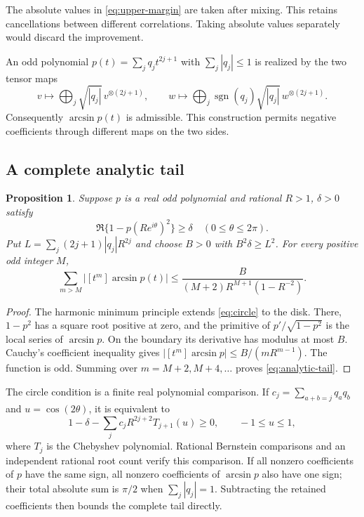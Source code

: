 \documentclass[11pt]{article}
\newtheorem{proposition}{Proposition}
\begin{document}
The absolute values in \eqref{eq:upper-margin} are taken after mixing. This retains cancellations between different correlations. Taking absolute values separately would discard the improvement.

An odd polynomial $p(t)=\sum_jq_jt^{2j+1}$ with $\sum_j|q_j|\le1$ is realized by the two tensor maps
\begin{equation*}
 v\longmapsto\bigoplus_j\sqrt{|q_j|}\,v^{\otimes(2j+1)},
 \qquad
 w\longmapsto\bigoplus_j\operatorname{sgn}(q_j)\sqrt{|q_j|}\,
 w^{\otimes(2j+1)}.
\end{equation*}
Consequently $\arcsin p(t)$ is admissible. This construction permits negative coefficients through different maps on the two sides.

\subsection{A complete analytic tail}
\begin{proposition}\label{prop:analytic-tail}
Suppose $p$ is a real odd polynomial and rational $R>1$, $\delta>0$ satisfy
\begin{equation}\label{eq:circle}
 \Re\{1-p(Re^{i\theta})^2\}\ge\delta
 \quad(0\le\theta\le2\pi).
\end{equation}
Put $L=\sum_j(2j+1)|q_j|R^{2j}$ and choose $B>0$ with $B^2\delta\ge L^2$. For every positive odd integer $M$,
\begin{equation}\label{eq:analytic-tail}
 \sum_{m>M}|[t^m]\arcsin p(t)|
 \le\frac{B}{(M+2)R^{M+1}(1-R^{-2})}.
\end{equation}
\end{proposition}
\begin{proof}
The harmonic minimum principle extends \eqref{eq:circle} to the disk. There, $1-p^2$ has a square root positive at zero, and the primitive of $p'/\sqrt{1-p^2}$ is the local series of $\arcsin p$. On the boundary its derivative has modulus at most $B$. Cauchy's coefficient inequality gives $|[t^m]\arcsin p|\le B/(mR^{m-1})$. The function is odd. Summing over $m=M+2,M+4,\ldots$ proves \eqref{eq:analytic-tail}.
\end{proof}

The circle condition is a finite real polynomial comparison. If $c_j=\sum_{a+b=j}q_aq_b$ and $u=\cos(2\theta)$, it is equivalent to
\begin{equation}\label{eq:circle-polynomial}
 1-\delta-\sum_jc_jR^{2j+2}T_{j+1}(u)\ge0,
 \qquad -1\le u\le1,
\end{equation}
where $T_j$ is the Chebyshev polynomial. Rational Bernstein comparisons and an independent rational root count verify this comparison. If all nonzero coefficients of $p$ have the same sign, all nonzero coefficients of $\arcsin p$ also have one sign; their total absolute sum is $\pi/2$ when $\sum_j|q_j|=1$. Subtracting the retained coefficients then bounds the complete tail directly.
\end{document}
